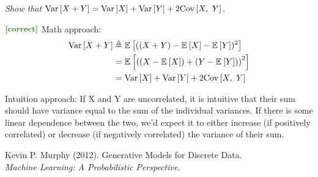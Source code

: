 \documentclass[11pt]{article}
\begin{document}
\begin{example}
	{\itshape
		Show that $\mathrm{Var}\left[X + Y\right] = \mathrm{Var}\left[X\right] + \mathrm{Var}\left[Y\right] + 2 \mathrm{Cov}\left[X,~ Y\right]$.
	}

$\mtgreen{[correct]}$ Math approach:
	\begin{align}
		\mathrm{Var}\left[X + Y\right]
			&\triangleq \mathbb{E}_{}\left[((X + Y) - \mathbb{E}_{}\left[X\right] - \mathbb{E}_{}\left[Y\right])^2\right] \\
			&= \mathbb{E}_{}\left[\left(
					(X - \mathbb{E}_{}\left[X\right]) +
					(Y - \mathbb{E}_{}\left[Y\right])
				\right)^2\right] \\
			&= \mathrm{Var}\left[X\right] + \mathrm{Var}\left[Y\right] + 2 \mathrm{Cov}\left[X,~ Y\right] 
	\end{align}
	
\vspace{1em}

Intuition approach: If X and Y are uncorrelated, it is intuitive that their sum should have variance equal to the sum of the individual variances. If there is some linear dependence between the two, we'd expect it to either increase (if positively correlated) or decrease (if negatively correlated) the variance of their sum.  
\end{example}










\vspace{-1.7em}
{\scriptsize Kevin P. Murphy (2012). Generative Models for Discrete Data.\\ \textit{Machine Learning: A Probabilistic Perspective}.\\ }
\end{document}
